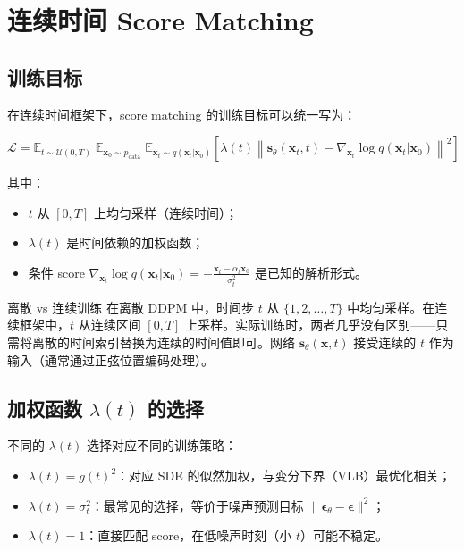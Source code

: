 \documentclass[a4paper]{article}
\begin{document}
\section{连续时间 Score Matching}

\subsection{训练目标}

在连续时间框架下，score matching 的训练目标可以统一写为：

$$
\mathcal{L} = \mathbb{E}_{t \sim \mathcal{U}(0,T)}\;\mathbb{E}_{\mathbf{x}_0 \sim p_{\text{data}}}\;\mathbb{E}_{\mathbf{x}_t \sim q(\mathbf{x}_t|\mathbf{x}_0)}\left[\lambda(t)\left\|\mathbf{s}_\theta(\mathbf{x}_t, t) - \nabla_{\mathbf{x}_t}\log q(\mathbf{x}_t|\mathbf{x}_0)\right\|^2\right]
$$

其中：
\begin{itemize}
    \item $t$ 从 $[0, T]$ 上均匀采样（连续时间）；
    \item $\lambda(t)$ 是时间依赖的加权函数；
    \item 条件 score $\nabla_{\mathbf{x}_t}\log q(\mathbf{x}_t|\mathbf{x}_0) = -\frac{\mathbf{x}_t - \alpha_t \mathbf{x}_0}{\sigma_t^2}$ 是已知的解析形式。
\end{itemize}

\begin{importantbox}{离散 vs 连续训练}
在离散 DDPM 中，时间步 $t$ 从 $\{1, 2, \ldots, T\}$ 中均匀采样。在连续框架中，$t$ 从连续区间 $[0, T]$ 上采样。实际训练时，两者几乎没有区别——只需将离散的时间索引替换为连续的时间值即可。网络 $\mathbf{s}_\theta(\mathbf{x}, t)$ 接受连续的 $t$ 作为输入（通常通过正弦位置编码处理）。
\end{importantbox}

\subsection{加权函数 $\lambda(t)$ 的选择}

不同的 $\lambda(t)$ 选择对应不同的训练策略：

\begin{itemize}
    \item $\lambda(t) = g(t)^2$：对应 SDE 的似然加权，与变分下界（VLB）最优化相关；
    \item $\lambda(t) = \sigma_t^2$：最常见的选择，等价于噪声预测目标 $\|\boldsymbol{\epsilon}_\theta - \boldsymbol{\epsilon}\|^2$；
    \item $\lambda(t) = 1$：直接匹配 score，在低噪声时刻（小 $t$）可能不稳定。
\end{itemize}
\end{document}
